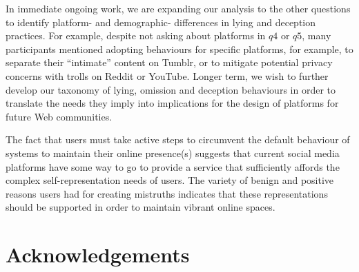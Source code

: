 \documentclass{sig-alternate}
\begin{document}
In immediate ongoing work, we are expanding our analysis to the other questions to identify platform- and demographic- differences in lying and deception practices.  For example, despite not asking about platforms in $q4$ or $q5$, many participants mentioned adopting behaviours for specific platforms, for example, to separate their ``intimate'' content on Tumblr, or to mitigate potential privacy concerns with trolls on Reddit or YouTube. Longer term, we wish to further develop our taxonomy of lying, omission and deception behaviours in order to translate the needs they imply into implications for the design of  platforms for future Web communities.

The fact that users must take active steps to circumvent the default behaviour of systems to maintain their online presence(s) suggests that current social media platforms have some way to go to provide a service that sufficiently affords the complex self-representation needs of users. The variety of benign and positive reasons users had for creating mistruths indicates that these representations should be supported in order to maintain vibrant online spaces.





\section{Acknowledgements}
\end{document}
